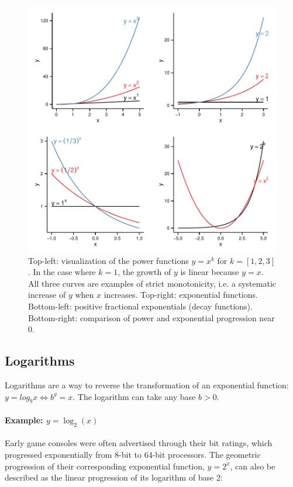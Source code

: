 \begin{knitrout}
\color{fgcolor}\begin{figure}[]

\includegraphics[width=\linewidth]{images/math-exps-and-powers} \caption{Top-left: visualization of the power functions $y = x^k$ for $k = [1,2,3]$. In the case where $k = 1$, the growth of $y$ is linear because $y = x$. All three curves are examples of strict monotonicity, i.e. a systematic increase of $y$ when $x$ increases. Top-right: exponential functions. Bottom-left: positive fractional exponentials (decay functions). Bottom-right: comparison of power and exponential progression near $0$.\label{fig:exps-and-powers}}
\end{figure}


\end{knitrout}


%
%
\subsection{Logarithms}

Logarithms are a way to reverse the transformation of an exponential function: $y = log_b x \iff b^y = x$. The logarithm can take any base $b > 0$.

%
\paragraph{Example: $y = \log_2(x)$} %
%
Early game consoles were often advertised through their bit ratings, which progressed exponentially from 8-bit to 64-bit processors. The geometric progression of their corresponding exponential function, $y = 2^x$, can also be described as the linear progression of its logarithm of base 2:

